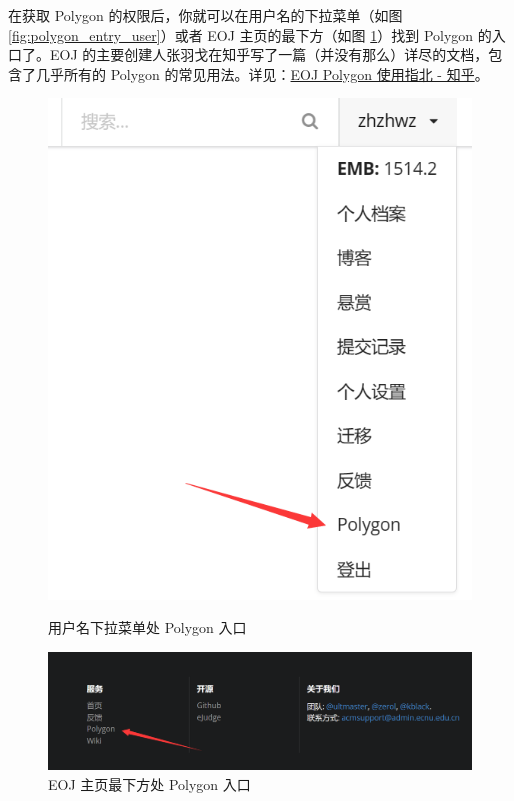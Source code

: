 \documentclass[oneside]{book}
\begin{document}
在获取 Polygon 的权限后，你就可以在用户名的下拉菜单（如图 \ref{fig:polygon_entry_user}）或者 EOJ 主页的最下方（如图 \ref{fig:polygon_entry_main_page}）找到 Polygon 的入口了。EOJ 的主要创建人张羽戈在知乎写了一篇（并没有那么）详尽的文档，包含了几乎所有的 Polygon 的常见用法。详见：\href{https://zhuanlan.zhihu.com/p/59869879}{EOJ Polygon 使用指北 - 知乎}。

\begin{figure}[htbp]
  \centering
  \begin{minipage}{0.28\textwidth}
    \centering
    \includegraphics[width=\textwidth]{res/polygon_entry_user.png}
    \caption{用户名下拉菜单处 Polygon 入口}
    \label{fig:polygon_entry_user}
  \end{minipage}
  \begin{minipage}{0.7\textwidth}
    \centering
    \includegraphics[width=\textwidth]{res/polygon_entry_main_page.png}
    \caption{EOJ 主页最下方处 Polygon 入口}
    \label{fig:polygon_entry_main_page}
  \end{minipage}
\end{figure}
\end{document}

